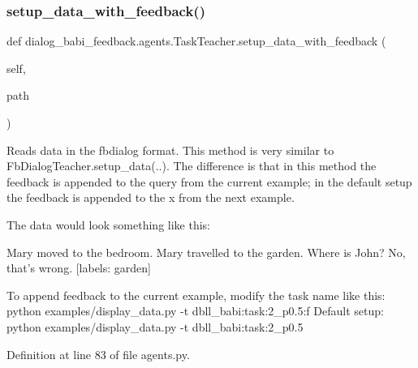 \subsubsection{\texorpdfstring{setup\+\_\+data\+\_\+with\+\_\+feedback()}{setup\_data\_with\_feedback()}}
{\footnotesize\ttfamily def dialog\+\_\+babi\+\_\+feedback.\+agents.\+Task\+Teacher.\+setup\+\_\+data\+\_\+with\+\_\+feedback (\begin{DoxyParamCaption}\item[{}]{self,  }\item[{}]{path }\end{DoxyParamCaption})}

\begin{DoxyVerb}Reads data in the fbdialog format. This method is very similar to
FbDialogTeacher.setup_data(..). The difference is that in this method the
feedback is appended to the query from the current example; in the default setup
the feedback is appended to the x from the next example.

The data would look something like this:

Mary moved to the bedroom.
Mary travelled to the garden.
Where is John?
No, that's wrong.
[labels: garden]

To append feedback to the current example, modify the task name like this:
  python examples/display_data.py -t dbll_babi:task:2_p0.5:f
Default setup:
  python examples/display_data.py -t dbll_babi:task:2_p0.5
\end{DoxyVerb}
 

Definition at line 83 of file agents.\+py.



